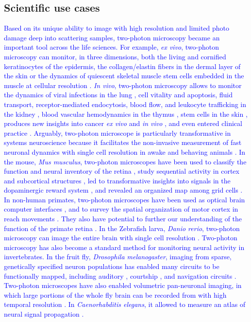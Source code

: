 \documentclass[10pt,letterpaper]{article}
\begin{document}
\subsection*{Scientific use cases}
\textcolor{blue}{Based on its unique ability to image with high resolution and limited photo damage deep into scattering samples, two-photon microscopy became an important tool across the life sciences. For example, \textit{ex vivo}, two-photon microscopy can monitor, in three dimensions, both the living and cornified keratinocytes of the epidermis, the collagen/elastin fibers in the dermal layer of the skin \cite{So1998} or the dynamics of quiescent skeletal muscle stem cells embedded in the muscle at cellular resolution \cite{Ma2024}. \textit{In vivo}, two-photon microscopy allows to monitor the dynamics of viral infections in the lung \cite{Ueki2020}, cell vitality and apoptosis, fluid transport, receptor-mediated endocytosis, blood flow, and leukocyte trafficking in the kidney \cite{Dunn2002}, 
blood vascular hemodynamics in the thymus \cite{Seyedhassantehrani2024}, stem cells in the skin \cite{Huang2017}, produces new insights into cancer \textit{ex vivo} and \textit{in vivo} \cite{Perry2012}, and even entered clinical practice \cite{Konig2007}.\newline
Arguably, two-photon microscope is particularly transformative in systems neuroscience because it facilitates the non-invasive measurement of fast neuronal dynamics with single cell resolution in awake and behaving animals \cite{Luu2024, Grienberger2022}. In the mouse, \textit{Mus musculus}, two-photon microscopes have been used to classify the function and neural inventory of the retina \cite{Baden2016}, study sequential activity in cortex \cite{Harvey2012} and subcortical structures \cite{Nieh2021}, led to transformative insights into signals in the dopaminergic reward system \cite{Engelhard2019}, and revealed an organized map among grid cells \cite{Yu2018}. In non-human primates, two-photon microscopes have been used as optical brain computer interfaces \cite{Trautmann2021}, and to survey the spatial organization of motor cortex in reach movements \cite{Ebina2018}. They also have potential to further our understanding of the function of the primate retina \cite{Sharma2016, Schottdorf2021}. In the Zebrafish larva, \textit{Danio rerio}, two-photon microscopy can image the entire brain with single cell resolution \cite{Renninger2013}. Two-photon microscopy has also become a standard method for monitoring neural activity in invertebrates. In the fruit fly, \textit{Drosophila melanogaster}, imaging from sparse, genetically specified neuron populations \cite{Seelig2010, Lin2022} has enabled many circuits to be functionally mapped, including auditory \cite{Baker2022}, courtship \cite{Deutsch2020, Roemschied2023}, and navigation circuits \cite{Kim2017}. Two-photon microscopes have also enabled volumetric pan-neuronal imaging, in which large portions of the whole fly brain can be recorded from with high temporal resolution \cite{Pacheco2021,Brezovec2024}. In \textit{Caenorhabditis elegans}, it allowed to measure an atlas of neural signal propagation \cite{Randi2023}.\newline
}
\end{document}
